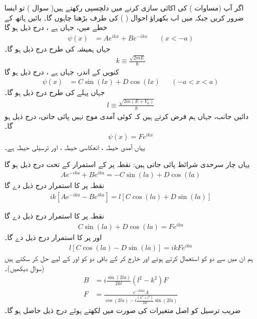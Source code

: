  اگر آپ  (مساوات )  کی اکائی سازی کرنے میں دلچسپی رکھتے ہیں( سوال ) تو ایسا ضرور کریں جبکہ میں اب بکھراؤ احوال ( ) کی طرف بڑھنا چاہوں گا۔ بائیں ہاتھ  کے خطے میں، جہاں ہے ، درج ذیل ہو گا 
\begin{align}
\psi(x)&=Ae^{i k x}+Be^{-i k x} && (x<-a) 
\end{align}
 جہاں ہمیشہ کی طرح درج ذیل ہو گا۔
 \begin{align}
 k\equiv \frac{\sqrt{2mE}}{\hslash} 
 \end{align} 
 کنویں کے اندر، جہاں ہے ، درج ذیل ہو گا
\begin{align}
\psi(x)&=C\sin(lx)+D\cos(lx)&& (-a<x<a)
 \end{align}
 جہاں پہلے کی طرح درج ذیل ہو گا۔
 \begin{align}
 l\equiv \frac{\sqrt{2m(E+V_{0})}}{\hslash}
 \end{align}
 دائیں جانب، جہاں ہم فرض کرتے ہیں کہ کوئی آمدی موج نہیں پائی جاتی، درج ذیل ہو گا۔
 \begin{align}
 \psi(x)=Fe^{i k x} 
 \end{align}
 یہاں آمدی حیطہ ، انعکاسی حیطہ ،  اور ترسیلی حیطہ  ہے۔ 
 
 یہاں چار سرحدی شرائط پائی جاتی ہیں: نقطہ  پر  کے استمرار کے تحت درج ذیل ہو گا
\begin{align}\label{مساوات_شروڈنگر_اے}
Ae^{-ika}+Be^{ika} = -C\sin(la)+D\cos(la)
 \end{align}
نقطہ پر کا استمرار درج ذیل دے گا
\begin{align}\label{مساوات_شروڈنگر_اے_بی}
ik[Ae^{-ika}-Be^{ika}] =l[C\cos(la)+D\sin(la)] 
\end{align}

نقطہ  پر کا استمرار درج ذیل دے گا 
\begin{align}\label{مساوات_شروڈنگر_سی}
C\sin (la)+D\cos(la)=Fe^{ika} 
\end{align}
اور  پر کا استمرار درج ذیل دے گا۔
\begin{align}\label{مساوات_شروڈنگر_ڈی}
l[C\cos(la)-D\sin(la)]=ikFe^{ika} 
\end{align}
 ہم ان میں سے دو کو استعمال کرتے ہوئے  اور  خارج کر کے باقی دو کو اور  کے لیے حل کر سکتے ہیں (سوال  دیکھیں)۔
\begin{align}
B&=i\frac{\sin(2la)}{2kl}(l^{2}-k^{2})F \label{مساوات_شروڈنگر_بی}\\
F&=\frac{e^{-2ika}A}{\cos(2la)-i\frac{(k^{2}+l^{2})}{2kl}\sin(2la)}\label{مساوات_شروڈنگر_ایف}
\end{align}
 ضریب ترسیل کو اصل متغیرات کی صورت میں لکھتے ہوئے درج ذیل حاصل ہو گا۔

